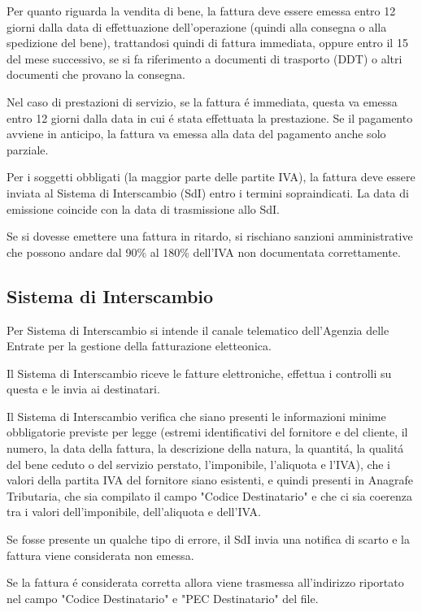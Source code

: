 \documentclass{article}
\begin{document}
Per quanto riguarda la vendita di bene, la fattura deve essere emessa entro 12 giorni dalla data di effettuazione dell'operazione (quindi alla consegna o alla spedizione del bene), trattandosi quindi di fattura immediata,
oppure entro il 15 del mese successivo, se si fa riferimento a documenti di trasporto (DDT) o altri documenti che provano la consegna.

Nel caso di prestazioni di servizio, se la fattura \'e immediata, questa va emessa entro 12 giorni dalla data in cui \'e stata effettuata la prestazione.
Se il pagamento avviene in anticipo, la fattura va emessa alla data del pagamento anche solo parziale. 

Per i soggetti obbligati (la maggior parte delle partite IVA), la fattura deve essere inviata al Sistema di Interscambio (SdI) entro i termini sopraindicati. La data di emissione coincide con la data di trasmissione allo SdI.

Se si dovesse emettere una fattura in ritardo, si rischiano sanzioni amministrative che possono andare dal 90\% al 180\% dell'IVA non documentata correttamente. 

\subsection{Sistema di Interscambio}
Per Sistema di Interscambio si intende il canale telematico dell'Agenzia delle Entrate per la gestione della fatturazione eletteonica.

Il Sistema di Interscambio riceve le fatture elettroniche, effettua i controlli su questa e le invia ai destinatari. 

Il Sistema di Interscambio verifica che siano presenti le informazioni minime obbligatorie previste per legge 
(estremi identificativi del fornitore e del cliente, il numero, la data della fattura, la descrizione della natura, la quantit\'a, la qualit\'a del bene ceduto o del servizio perstato, l'imponibile, l'aliquota e l'IVA),
che i valori della partita IVA del fornitore siano esistenti, e quindi presenti in Anagrafe Tributaria, che sia compilato il campo "Codice Destinatario" e che ci sia coerenza tra i valori dell'imponibile, dell'aliquota e dell'IVA.

Se fosse presente un qualche tipo di errore, il SdI invia una notifica di scarto e la fattura viene considerata non emessa. 

Se la fattura \'e considerata corretta allora viene trasmessa all'indirizzo riportato nel campo "Codice Destinatario" e "PEC Destinatario" del file.
\end{document}
